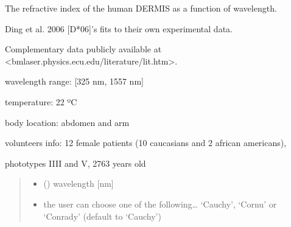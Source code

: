 \documentclass[letterpaper,10pt,english]{sphinxmanual}
\begin{document}

\begin{fulllineitems}
\label{\detokenize{05_refractive_index:skinoptics.refractive_index.n_DE_Ding}}
\pysigstartsignatures
{}
\pysigstopsignatures
\begin{DUlineblock}{0em}
\item[] The refractive index of the human DERMIS as a function of wavelength.
\item[] Ding et al. 2006 {[}D*06{]}’s fits to their own experimental data.
\item[] Complementary data publicly available at \textless{}bmlaser.physics.ecu.edu/literature/lit.htm\textgreater{}.
\end{DUlineblock}

\begin{DUlineblock}{0em}
\item[] wavelength range: {[}325 nm, 1557 nm{]}
\item[] temperature: 22 ºC
\item[] body location: abdomen and arm
\item[] volunteers info: 12 female patients (10 caucasians and 2 african americans),
\item[] phototypes I\sphinxhyphen{}III and V, 27\sphinxhyphen{}63 years old
\end{DUlineblock}
\begin{quote}\begin{description}
\begin{itemize}
\item {} 
\sphinxAtStartPar
{} () \textendash{} wavelength {[}nm{]}

\item {} 
\sphinxAtStartPar
{} \textendash{} the user can choose one of the following… ‘Cauchy’, ‘Cornu’ or ‘Conrady’ (default to ‘Cauchy’)


\end{itemize}
\end{description}
\end{quote}
\end{fulllineitems}
\end{document}
